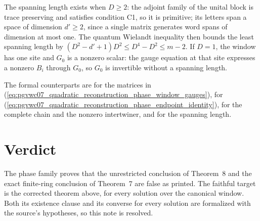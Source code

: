 \documentclass{article}
\begin{document}
The spanning length exists when $D\geq2$: the adjoint family of the unital
block is trace preserving and satisfies condition C1, so it is primitive; its
letters span a space of dimension $d'\geq2$, since a single matrix generates
word spans of dimension at most one. The quantum Wielandt inequality then
bounds the least spanning length by $(D^2-d'+1)D^2\leq D^4-D^2\leq m-2$. If
$D=1$, the window has one site and $G_0$ is a nonzero scalar: the gauge
equation at that site expresses a nonzero $B_i$ through $G_0$, so $G_0$ is
invertible without a spanning length.

The formal counterparts are
 for the matrices
in (\ref{eq:pgvwc07_quadratic_reconstruction_phase_window_gauges}),
 for
(\ref{eq:pgvwc07_quadratic_reconstruction_phase_endpoint_identity}),
 for the complete chain and the
nonzero intertwiner, and
 for the spanning
length.

\section{Verdict}

The phase family proves that the unrestricted conclusion of Theorem~8 and the
exact finite-ring conclusion of Theorem~7 are false as printed. The faithful
target is the corrected theorem above, for every solution over the canonical
window. Both its existence clause and its converse for every solution are
formalized with the source's hypotheses, so this note is resolved.




\end{document}
